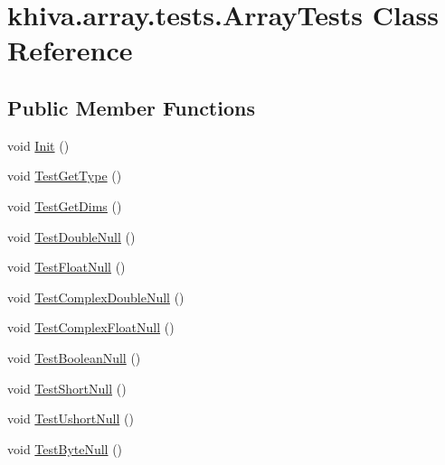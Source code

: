 \hypertarget{classkhiva_1_1array_1_1tests_1_1_array_tests}{}\section{khiva.\+array.\+tests.\+Array\+Tests Class Reference}
\label{classkhiva_1_1array_1_1tests_1_1_array_tests}
\subsection*{Public Member Functions}
\begin{DoxyCompactItemize}
\item 
void \mbox{\hyperlink{classkhiva_1_1array_1_1tests_1_1_array_tests_ac70ee772bc0e6f1d37f66c7a4345df5e}{Init}} ()
\item 
void \mbox{\hyperlink{classkhiva_1_1array_1_1tests_1_1_array_tests_a93c4df898907e810e73152d5872036a3}{Test\+Get\+Type}} ()
\item 
void \mbox{\hyperlink{classkhiva_1_1array_1_1tests_1_1_array_tests_a64bbba90fe580e98cba6c5b33384930f}{Test\+Get\+Dims}} ()
\item 
void \mbox{\hyperlink{classkhiva_1_1array_1_1tests_1_1_array_tests_a4c411189d5ca6eafaeac5a95ea19269d}{Test\+Double\+Null}} ()
\item 
void \mbox{\hyperlink{classkhiva_1_1array_1_1tests_1_1_array_tests_a3c24a0fa2d099d15294b8a2c56f82a29}{Test\+Float\+Null}} ()
\item 
void \mbox{\hyperlink{classkhiva_1_1array_1_1tests_1_1_array_tests_ab500cceff8cb4502680be3fe7950e376}{Test\+Complex\+Double\+Null}} ()
\item 
void \mbox{\hyperlink{classkhiva_1_1array_1_1tests_1_1_array_tests_ab6a6a5d6ab2f6cd4db6fc7ed61d6fd3b}{Test\+Complex\+Float\+Null}} ()
\item 
void \mbox{\hyperlink{classkhiva_1_1array_1_1tests_1_1_array_tests_af430825597c6c381bc886ee8265e4d59}{Test\+Boolean\+Null}} ()
\item 
void \mbox{\hyperlink{classkhiva_1_1array_1_1tests_1_1_array_tests_afe1c8f914c3adb555faf282b8b9c1b22}{Test\+Short\+Null}} ()
\item 
void \mbox{\hyperlink{classkhiva_1_1array_1_1tests_1_1_array_tests_aca7bf16329d72fb93a2b1a78d3812a82}{Test\+Ushort\+Null}} ()
\item 
void \mbox{\hyperlink{classkhiva_1_1array_1_1tests_1_1_array_tests_acba72b76c602f9c9c47cc5e699017d72}{Test\+Byte\+Null}} ()
\item 

\end{DoxyCompactItemize}

